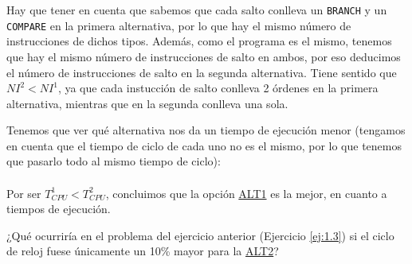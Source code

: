 \begin{ejercicio}
    Hay que tener en cuenta que sabemos que cada salto conlleva un \verb|BRANCH| y un \verb|COMPARE| en la primera alternativa,
    por lo que hay el mismo número de instrucciones de dichos tipos. Además, como el programa es el mismo,
    tenemos que hay el mismo número de instrucciones de salto en ambos, por eso deducimos el número de instrucciones de salto en la segunda alternativa.
    Tiene sentido que $NI^2 < NI^1$, ya que cada instucción de salto conlleva 2 órdenes en la primera alternativa, mientras que en la segunda conlleva una sola.

    Tenemos que ver qué alternativa nos da un tiempo de ejecución menor
    (tengamos en cuenta que el tiempo de ciclo de cada uno no es el mismo, por lo que tenemos que pasarlo todo al mismo tiempo de ciclo):
    \begin{align*}
    \end{align*}

    Por ser $T_{CPU}^1 < T_{CPU}^2$, concluimos que la opción \ul{ALT1} es la mejor, en cuanto a tiempos de ejecución.
\end{ejercicio}

\begin{ejercicio}
    ¿Qué ocurriría en el problema del ejercicio anterior (Ejercicio \ref{ej:1.3}) si el ciclo de reloj fuese únicamente un 10\% mayor para
    la \ul{ALT2}?
\end{ejercicio}

